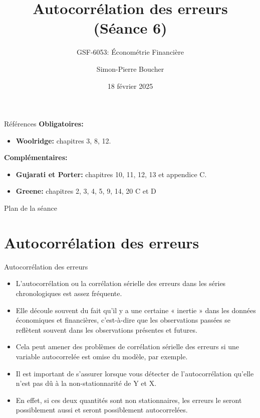 \documentclass{beamer}
\title[S03 Extensions MLS]{Autocorrélation des erreurs\\ (Séance 6)}
\subtitle{GSF-6053: Économétrie Financière}
\author[SP. Boucher]{Simon-Pierre Boucher\inst{1}}
\institute[Université Laval]
{
  \inst{1}%
  Département de finance, assurance et immobilier\\
  Faculté des sciences de l'administration\\
  Université Laval}
\date[Hiver 2025]{18 février 2025}
\begin{document}
\begin{frame}
  \titlepage
\end{frame}

\begin{frame}{Références}
\textbf{Obligatoires:}
\begin{itemize}

\item \textbf{Woolridge:} chapitres 3, 8, 12.
\end{itemize}
\vspace{0.5cm}
\textbf{Complémentaires:}
\begin{itemize}
\item \textbf{Gujarati et Porter:} chapitres 10, 11, 12, 13 et appendice C.
\item \textbf{Greene:} chapitres 2, 3, 4, 5, 9, 14, 20 C et D
\end{itemize}
\end{frame}


\begin{frame}{Plan de la séance}
  \tableofcontents
\end{frame}

\section{Autocorrélation des erreurs}

\frame{\tableofcontents[current]}


\begin{frame}{Autocorrélation des erreurs}
\begin{itemize}
\item L’autocorrélation ou la corrélation sérielle des erreurs dans les séries chronologiques est assez fréquente. 
\item Elle découle souvent du fait qu’il y a une certaine « inertie » dans les données économiques et financières, c’est-à-dire que les observations passées se reflètent souvent dans les observations présentes et futures. 
\item Cela peut amener des problèmes de corrélation sérielle des erreurs si une variable autocorrelée est omise du modèle, par exemple.
\item Il est important de s’assurer lorsque vous détecter de l’autocorrélation qu’elle n’est pas dû à la non-stationnarité de Y et X. 
\item En effet, si ces deux quantités sont non stationnaires, les erreurs le seront possiblement aussi et seront possiblement autocorrelées.

\end{itemize}
\end{frame}
\end{document}
